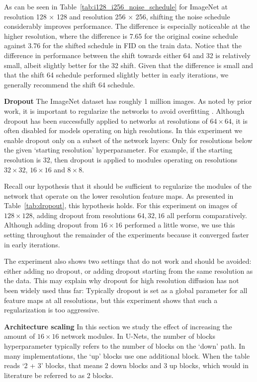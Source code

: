 As can be seen in Table~\ref{tab:i128_i256_noise_schedule} for ImageNet at resolution 128 $\times$ 128 and resolution 256 $\times$ 256, shifting the noise schedule considerably improves performance. The difference is especially noticeable at the higher resolution, where the difference is 7.65 for the original cosine schedule against 3.76 for the shifted schedule in FID on the train data. Notice that the difference in performance between the shift towards either 64 and 32 is relatively small, albeit slightly better for the 32 shift. Given that the difference is small and that the shift 64 schedule performed slightly better in early iterations, we generally recommend the shift 64 schedule.

\textbf{Dropout}
The ImageNet dataset has roughly 1 million images. As noted by prior work, it is important to regularize the networks to avoid overfitting \citep{ho2022cascaded,dhariwal2021diffusionbeatgans}. Although dropout has been successfully applied to networks at resolutions of $64 \times 64$, it is often disabled for models operating on high resolutions. In this experiment we enable dropout only on a subset of the network layers: Only for resolutions below the given `starting resolution' hyperparameter. For example, if the starting resolution is $32$, then dropout is applied to modules operating on resolutions $32 \times 32$, $16 \times 16$ and $8 \times 8$.

Recall our hypothesis that it should be sufficient to regularize the modules of the network that operate on the lower resolution feature maps. As presented in Table~\ref{tab:dropout}, this hypothesis holds. For this experiment on images of $128 \times 128$, adding dropout from resolutions $64, 32, 16$ all perform comparatively. Although adding dropout from $16 \times 16$ performed a little worse, we use this setting throughout the remainder of the experiments because it converged faster in early iterations.

The experiment also shows two settings that do not work and should be avoided: either adding no dropout, or adding dropout starting from the same resolution as the data. This may explain why dropout for high resolution diffusion has not been widely used thus far: Typically dropout is set as a global parameter for all feature maps at all resolutions, but this experiment shows that such a regularization is too aggressive.

\textbf{Architecture scaling}
In this section we study the effect of increasing the amount of $16 \times 16$ network modules. In U-Nets, the number of blocks hyperparameter typically refers to the number of blocks on the `down' path. In many implementations, the `up' blocks use one additional block. When the table reads `2 + 3' blocks, that means 2 down blocks and 3 up blocks, which would in literature be referred to as 2 blocks.

